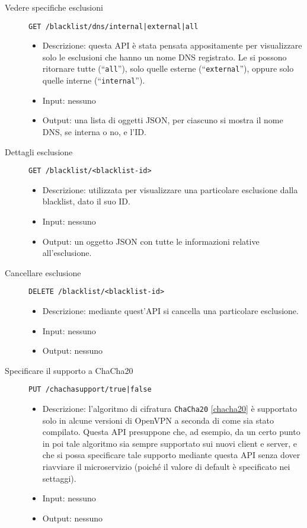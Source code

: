 \begin{description}
    \item[Vedere specifiche esclusioni]\texttt{GET /blacklist/dns/internal|external|all}
    \begin{itemize}
        \item Descrizione: questa API è stata pensata appositamente per visualizzare solo
        le esclusioni che hanno un nome DNS registrato. Le si possono ritornare
        tutte (``\texttt{all}''), solo quelle esterne (``\texttt{external}''),
        oppure solo quelle interne (``\texttt{internal}'').
        \item Input: nessuno
        \item Output: una lista di oggetti JSON, per ciascuno si mostra il nome DNS,
        se interna o no, e l'ID.
    \end{itemize}

    \item[Dettagli esclusione]\texttt{GET /blacklist/<blacklist-id>}
    \begin{itemize}
        \item Descrizione: utilizzata per visualizzare
        una particolare esclusione dalla blacklist, dato il suo ID.
        \item Input: nessuno
        \item Output: un oggetto JSON con tutte le informazioni relative all'esclusione.
    \end{itemize}

    \item[Cancellare esclusione]\texttt{DELETE /blacklist/<blacklist-id>}
    \begin{itemize}
        \item Descrizione: mediante quest'API si cancella una particolare esclusione. 
        \item Input: nessuno
        \item Output: nessuno
    \end{itemize}

    \item[Specificare il supporto a ChaCha20]\texttt{PUT /chachasupport/true|false}
    \begin{itemize}
        \item Descrizione: l'algoritmo di cifratura \texttt{ChaCha20} \ref{chacha20} è
        supportato solo in alcune versioni di OpenVPN a seconda di come sia stato compilato.
        Questa API presuppone che, ad esempio, da un certo punto in poi tale algoritmo sia
        sempre supportato sui nuovi client e server, e che si possa specificare tale
        supporto mediante questa API senza dover riavviare il microservizio (poiché
        il valore di default è specificato nei settaggi).
        \item Input: nessuno
        \item Output: nessuno
    \end{itemize}


\end{description}
